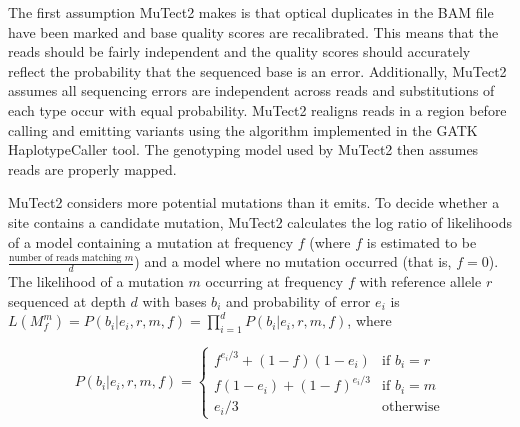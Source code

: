 The first assumption MuTect2 makes is that optical duplicates in the BAM file have been marked and base quality scores are recalibrated. This means that the reads should be fairly independent and the quality scores should accurately reflect the probability that the sequenced base is an error. Additionally, MuTect2 assumes all sequencing errors are independent across reads and substitutions of each type occur with equal probability.
MuTect2 realigns reads in a region before calling and emitting variants using the algorithm implemented in the GATK HaplotypeCaller tool. The genotyping model used by MuTect2 then assumes reads are properly mapped.



MuTect2 considers more potential mutations than it emits. To decide whether a site contains a candidate mutation, MuTect2 calculates the log ratio of likelihoods of a model containing a mutation at frequency $f$ (where $f$ is estimated to be $\frac{\text{number of reads matching }m}{d}$) and a model where no mutation occurred (that is, $f = 0$). The likelihood of a mutation $m$ occurring at frequency $f$ with reference allele $r$ sequenced at depth $d$ with bases $b_i$ and probability of error $e_i$ is $L(M_f^m)=P({b_i}|{e_i},r,m,f)=\prod_{i=1}^{d} P(b_i|e_i,r,m,f)$, where

$$
P(b_i|e_i,r,m,f)=
\begin{cases}
f^{e_i/3}+(1-f)(1-e_i) & \text{if } b_i=r \\
f(1-e_i) + (1-f)^{e_i/3} & \text{if } b_i=m \\
e_i/3 & \text{otherwise}
\end{cases}
$$

